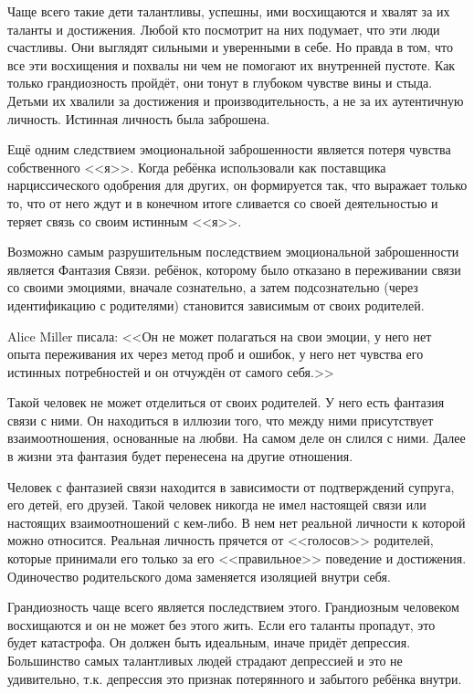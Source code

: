 \documentclass[10pt, fleqn]{article}
\begin{document}
Чаще всего такие дети талантливы, успешны, ими восхищаются и хвалят за их таланты и достижения. Любой кто посмотрит на них подумает, что эти люди счастливы. Они выглядят сильными и уверенными в себе. Но правда в том, что все эти восхищения и похвалы ни чем не помогают их внутренней пустоте.
Как только грандиозность пройдёт, они тонут в глубоком чувстве вины и стыда.
Детьми их хвалили за достижения и производительность, а не за их аутентичную личность. Истинная личность была заброшена.

Ещё одним следствием эмоциональной заброшенности является потеря чувства собственного <<я>>. Когда ребёнка использовали как поставщика нарциссического одобрения для других, он формируется так, что выражает только то, что от него ждут и в конечном итоге сливается со своей деятельностью и теряет связь со своим истинным <<я>>.

Возможно самым разрушительным последствием эмоциональной заброшенности является Фантазия Связи. ребёнок, которому было отказано в переживании связи со своими эмоциями, вначале сознательно, а затем подсознательно (через идентификацию с родителями) становится зависимым от своих родителей.

Alice Miller писала:
<<Он не может полагаться на свои эмоции, у него нет опыта переживания их через метод проб и ошибок, у него нет чувства его истинных потребностей и он отчуждён от самого себя.>>

Такой человек не может отделиться от своих родителей. У него есть фантазия связи с ними. Он находиться в иллюзии того, что между ними присутствует взаимоотношения, основанные на любви. На самом деле он слился с ними. Далее в жизни эта фантазия будет перенесена на другие отношения.

Человек с фантазией связи находится в зависимости от подтверждений супруга, его детей, его друзей. Такой человек никогда не имел настоящей связи или настоящих взаимоотношений с кем-либо. В нем нет реальной личности к которой можно относится. Реальная личность прячется от <<голосов>> родителей, которые принимали его только за его <<правильное>> поведение и достижения. Одиночество родительского дома заменяется изоляцией внутри себя.

Грандиозность чаще всего является последствием этого. Грандиозным человеком восхищаются и он не может без этого жить. Если его таланты пропадут, это будет катастрофа. Он должен быть идеальным, иначе придёт депрессия. Большинство самых талантливых людей страдают депрессией и это не удивительно, т.к. депрессия это признак потерянного и забытого ребёнка внутри.
\end{document}
